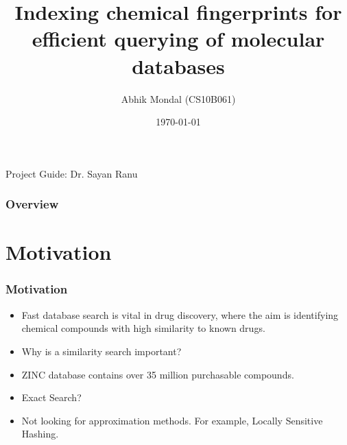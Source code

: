 \documentclass{beamer}
\title[Indexing fingerprints]{Indexing chemical fingerprints for efficient querying of molecular databases} %
\author{Abhik Mondal (CS10B061)} %
\institute[IIT Madras] %
{
IIT Madras \\ %
}
\date{\today} %
\begin{document}
\begin{frame}
\titlepage %
Project Guide: Dr. Sayan Ranu
\end{frame}
%

\begin{frame}
\frametitle{Overview} %
\tableofcontents %
\end{frame}




\section{Motivation}

\begin{frame}
\frametitle{Motivation}

\begin{itemize}

	\item<1-> Fast database search is vital in drug discovery, where the aim is identifying chemical compounds with high similarity to known drugs.


	\item<2-> Why is a similarity search important?
		
	\item<3->[] ZINC database contains over 35 million purchasable compounds.	

	\item<4->  Exact Search?
	
	\item<5->[] Not looking for approximation methods. For example, Locally Sensitive Hashing.
\end{itemize}

\end{frame}
\end{document}
